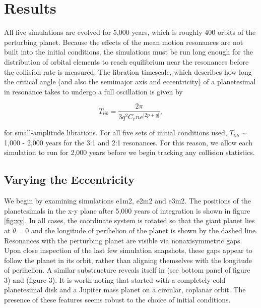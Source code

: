 \documentclass[twocolumn]{aastex63}
\begin{document}
\section{Results} \label{sec:results}

All five simulations are evolved for 5,000 years, which is roughly 400 orbits of the perturbing planet. Because the effects of the mean motion 
resonances are not built into the initial conditions, the simulations must be run long enough for the distribution of orbital elements to reach 
equilibrium near the resonances before the collision rate is measured. The libration timescale, which describes how long the critical angle (and also 
the semimajor axis and eccentricity) of a planetesimal in resonance takes to undergo a full oscillation is given by

\begin{equation}\label{eq:lib_time}
	T_{lib} = \frac{2 \pi}{3 q^{2} C_{r} n e^{\left| 2p + q \right|}},
\end{equation}

\noindent for small-amplitude librations. For all five sets of initial conditions used, $T_{lib} \sim$ 1,000 - 2,000 years for the 3:1 and 2:1 resonances. 
For this reason, we allow each simulation to run for 2,000 years before we begin tracking any collision statistics.

\subsection{Varying the Eccentricity}

We begin by examining simulations e1m2, e2m2 and e3m2. The positions of the planetesimals in the x-y plane after 5,000 years of integration is 
shown in figure \ref{fig:xy}. In all cases, the coordinate system is rotated so that the giant planet lies at $\theta = 0$ and the longitude of perihelion of 
the planet is shown by the dashed line. Resonances with the perturbing planet are visible via nonaxisymmetric gaps. Upon close inspection of the 
last few simulation snapshots, these gaps appear to follow the planet in its orbit, rather than aligning themselves with the longitude of perihelion. A 
similar substructure reveals itself in \citet{2000Icar..143...45R} (see bottom panel of figure 3) and \citet{2016ApJ...818..159T} (figure 3). It is worth 
noting that \citet{2000Icar..143...45R} started with a completely cold planetesimal disk and a Jupiter mass planet on a circular, coplanar orbit. The 
presence of these features seems robust to the choice of initial conditions.
\end{document}
